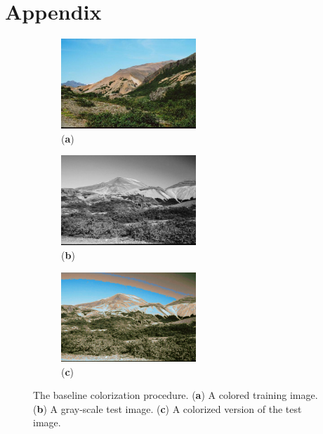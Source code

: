 \pagebreak
\section{Appendix}
\begin{figure}[H]
    \centering
    \begin{subfigure}{2.1in}
        \centering
        \includegraphics[width=2in]{./Images/mountain_color.jpg}
        \caption{(\textbf{a})}
    \end{subfigure}
    \begin{subfigure}{2.1in}
        \centering
        \includegraphics[width=2in]{./Images/mountain_gray.png}
        \caption{(\textbf{b})}
    \end{subfigure}
    \begin{subfigure}{2.1in}
        \centering
        \includegraphics[width=2in]{./Images/mountain_gray_colored_40.png}
        \caption{(\textbf{c})}
    \end{subfigure}
    \caption{The baseline colorization procedure. (\textbf{a}) A colored training image. (\textbf{b}) A gray-scale test image. (\textbf{c})  A colorized version of the test image.}
    \label{fig:baseline_result}
\end{figure}

